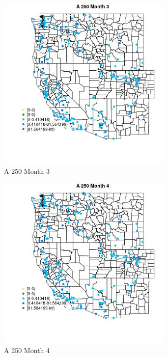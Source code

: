 \begin{figure} 
\centering  
\includegraphics[width=0.77\textwidth]{Code_Outputs/Report_ML_input_PM25_Step4_part_e_de_duplicated_aveswNAs_MapObsMo3A_250.jpg} 
\caption{\label{fig:Report_ML_input_PM25_Step4_part_e_de_duplicated_aveswNAsMapObsMo3A_250}A 250 Month 3} 
\end{figure} 
 

\begin{figure} 
\centering  
\includegraphics[width=0.77\textwidth]{Code_Outputs/Report_ML_input_PM25_Step4_part_e_de_duplicated_aveswNAs_MapObsMo4A_250.jpg} 
\caption{\label{fig:Report_ML_input_PM25_Step4_part_e_de_duplicated_aveswNAsMapObsMo4A_250}A 250 Month 4} 
\end{figure} 
 

